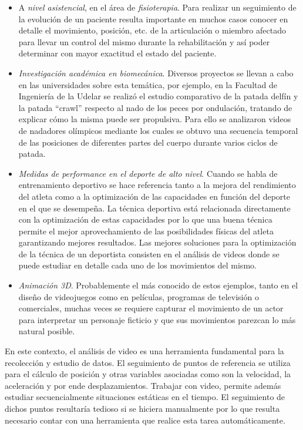 \begin{itemize}
\item A \emph{nivel asistencial}, en el área de \emph{fisioterapia}. Para realizar un seguimiento de la evolución de un paciente resulta importante en muchos casos conocer en detalle el movimiento, posición, etc. de la articulación o miembro afectado para llevar un control del mismo durante la rehabilitación y así poder determinar con mayor exactitud el estado del paciente.
\item \emph{Investigación académica en biomecánica}. Diversos proyectos se llevan a cabo en las universidades sobre esta temática, por ejemplo, en la Facultad de Ingeniería de la Udelar  se realizó el estudio comparativo de la patada delfín y la patada “crawl” respecto al nado de los peces por ondulación, tratando de explicar cómo la misma puede ser propulsiva. Para ello se analizaron videos de nadadores olímpicos mediante los cuales se obtuvo una secuencia temporal de las posiciones de diferentes partes del cuerpo durante varios ciclos de patada.
\item \emph{Medidas de performance en el deporte de alto nivel}. Cuando se habla de entrenamiento deportivo se hace referencia tanto a la mejora del rendimiento del atleta como a la optimización de las capacidades en función del deporte en el que se desempeña. La técnica deportiva está relacionada directamente con la optimización de estas capacidades por lo que una buena técnica permite el mejor aprovechamiento de las posibilidades físicas del atleta garantizando mejores resultados. Las mejores soluciones para la optimización de la técnica de un deportista consisten en el análisis de videos donde se puede estudiar en detalle cada uno de los movimientos del  mismo.
\item \emph{Animación 3D}. Probablemente el más conocido de estos ejemplos, tanto en el diseño de videojuegos como en películas, programas de televisión o comerciales, muchas veces se requiere capturar el movimiento de un actor para interpretar un personaje ficticio y que sus movimientos parezcan lo más natural posible.
\end{itemize}

En este contexto, el análisis de video  es  una  herramienta  fundamental para la recolección y estudio de datos. El seguimiento de puntos de referencia se utiliza para el cálculo de posición y otras variables asociadas como son la velocidad, la aceleración y por ende desplazamientos. Trabajar con video, permite además estudiar secuencialmente situaciones estáticas en el tiempo. El seguimiento de dichos puntos resultaría tedioso si se hiciera manualmente por lo que resulta necesario contar con una herramienta que realice esta tarea automáticamente.

